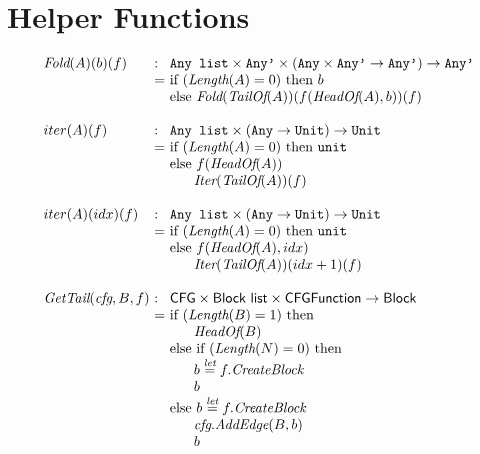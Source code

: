 \section{Helper Functions}
\[
\begin{array}{l@{}l@{~}l}
\Fold(A)(b)(f) & : & \TT{Any list} \times \TT{Any'} \times (\TT{Any} \times \TT{Any'} \rightarrow \TT{Any'}) \rightarrow \TT{Any'}\\
& = & \mbox{if}\ (\Length(A) = 0)\ \mbox{then}\ b \\
& & \mbox{else}\ \Fold(\TailOf(A))(f(\HeadOf(A),b))(f)\\
& & \\

iter(A)(f) & : & \TT{Any list} \times (\TT{Any} \rightarrow \Unit) \rightarrow \Unit\\
& = & \mbox{if}\ (\Length(A) = 0)\ \mbox{then}\ \TT{unit} \\
& & \mbox{else}\ f(\HeadOf(A))\\
& & \phantom{else} \Iter(\TailOf(A))(f)\\
& & \\

iter(A)(idx)(f) & : & \TT{Any list} \times (\TT{Any} \rightarrow \Unit) \rightarrow \Unit\\
& = & \mbox{if}\ (\Length(A) = 0)\ \mbox{then}\ \TT{unit} \\
& & \mbox{else}\ f(\HeadOf(A), idx)\\
& & \phantom{else} \Iter(\TailOf(A))(idx+1)(f)\\
& & \\

\GetTail(\emph{cfg}, B, f)\ & : & \SF{CFG} \times \SF{Block list} \times \SF{CFGFunction} \rightarrow \SF{Block}\\
& = & \mbox{if}\ (\Length(B) = 1)\ \mbox{then}\\
& & \phantom{else} \HeadOf(B) \\
& & \mbox{else}\ \mbox{if}\ (\Length(N) = 0)\ \mbox{then}\\
& & \phantom{else} b \letval f.\emph{CreateBlock}\\
& & \phantom{else} b\\
& & \mbox{else}\ b \letval f.\emph{CreateBlock}\\
& & \phantom{else} \emph{cfg}.\emph{AddEdge}(B, b)\\
& & \phantom{else} b\\
\end{array}
\]

